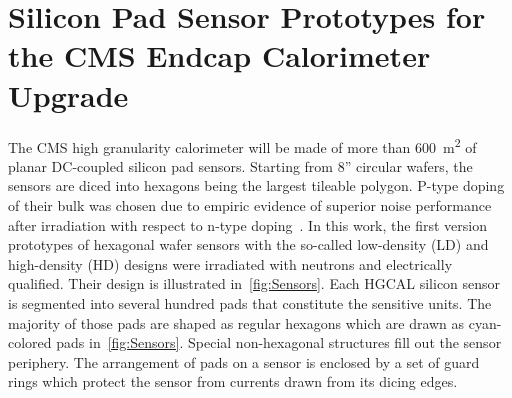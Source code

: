 \section{Silicon Pad Sensor Prototypes for the CMS Endcap Calorimeter Upgrade}
\label{sec:sensors}

The CMS high granularity calorimeter will be made of more than \SI{600}{\metre\squared} of planar DC-coupled silicon pad sensors.
Starting from 8'' circular wafers, the sensors are diced into hexagons being the largest tileable polygon.
P-type doping of their bulk was chosen due to empiric evidence of superior noise performance after irradiation with respect to n-type doping~\cite{Adam_2017}. %
In this work, the first version prototypes of hexagonal wafer sensors with the so-called low-density (LD) and high-density (HD) designs were irradiated with neutrons and electrically qualified.
Their design is illustrated in~\ref{fig:Sensors}.
Each HGCAL silicon sensor is segmented into several hundred pads that constitute the sensitive units. 
The majority of those pads are shaped as regular hexagons which are drawn as cyan-colored pads in~\ref{fig:Sensors}.
Special non-hexagonal structures fill out the sensor periphery.
The arrangement of pads on a sensor is enclosed by a set of guard rings which protect the sensor from currents drawn from its dicing edges.
